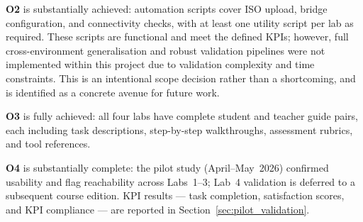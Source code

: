 \textbf{O2} is substantially achieved: automation scripts cover ISO upload,
bridge configuration, and connectivity checks, with at least one utility script
per lab as required. These scripts are functional and meet the defined KPIs;
however, full cross-environment generalisation and robust validation pipelines
were not implemented within this project due to validation complexity and time
constraints. This is an intentional scope decision rather than a shortcoming,
and is identified as a concrete avenue for future work.

\textbf{O3} is fully achieved: all four labs have complete student and teacher
guide pairs, each including task descriptions, step-by-step walkthroughs,
assessment rubrics, and tool references.

\textbf{O4} is substantially complete: the pilot study (April--May~2026) confirmed
usability and flag reachability across Labs~1--3; Lab~4 validation is deferred to
a subsequent course edition. KPI results --- task completion, satisfaction scores,
and KPI compliance --- are reported in Section~\ref{sec:pilot_validation}.
